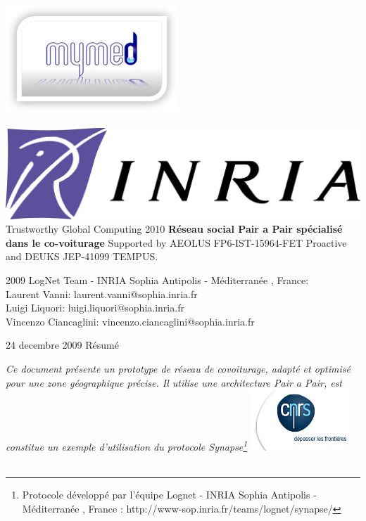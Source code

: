 \documentclass[a4paper,oneside,12pt]{article}
\begin{document}
\begin{titlepage}
\begin{center}
\includegraphics[scale=.4]{img/logos/logo-mymed} ~~~~~~~~~~~~~~~~~~~~~~~~~~~~~~~~~~~~~~~~~~~~~~~~~~~~~~~~~~~~~~~~~~~
\includegraphics[scale=.25]{img/logos/Logo_INRIA}
\vskip 1.5cm
Trustworthy Global Computing 2010
\vskip 1cm
{\Huge\bfseries Réseau social Pair a Pair spécialisé dans le co-voiturage}
\vskip 1cm
Supported by AEOLUS FP6-IST-15964-FET Proactive and DEUKS JEP-41099 TEMPUS.
\vskip 1.5cm
\end{center}
2009 LogNet Team - INRIA Sophia Antipolis - Méditerranée , France:\\
Laurent Vanni: laurent.vanni@sophia.inria.fr\\
Luigi Liquori: luigi.liquori@sophia.inria.fr\\
Vincenzo Ciancaglini: vincenzo.ciancaglini@sophia.inria.fr
\begin{center}
\vskip 0.5cm
24 decembre 2009
\vskip 1cm
Résumé\\
\end{center}
{\em Ce document présente un prototype de réseau de covoiturage, adapté et optimisé pour une zone géographique précise. Il utilise une architecture Pair a Pair, est constitue un exemple d'utilisation du protocole Synapse\footnote{Protocole développé par l'équipe Lognet - INRIA Sophia Antipolis - Méditerranée , France : http://www-sop.inria.fr/teams/lognet/synapse/}}
\vskip 2cm
\includegraphics[scale=0.7]{img/logos/cnrs} ~~~~~~~~~~~~~~~~~~~~~~

\end{titlepage}
\end{document}
